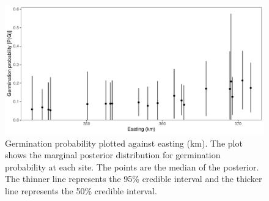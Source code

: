 \documentclass[12pt, oneside, titlepage]{article}   	%
\begin{document}
{ \begin{figure}[h]
   \centering
       \includegraphics[page=1,width=1\textwidth]{../figures/spatial-g1.pdf}  
    \caption{ Germination probability plotted against easting (km). The plot shows the marginal posterior distribution for germination probability at each site. The points are the median of the posterior. The thinner line represents the 95\% credible interval and the thicker line represents the 50\% credible interval. }
 \label{fig:test}
\end{figure}

\fi

}
\end{document}
